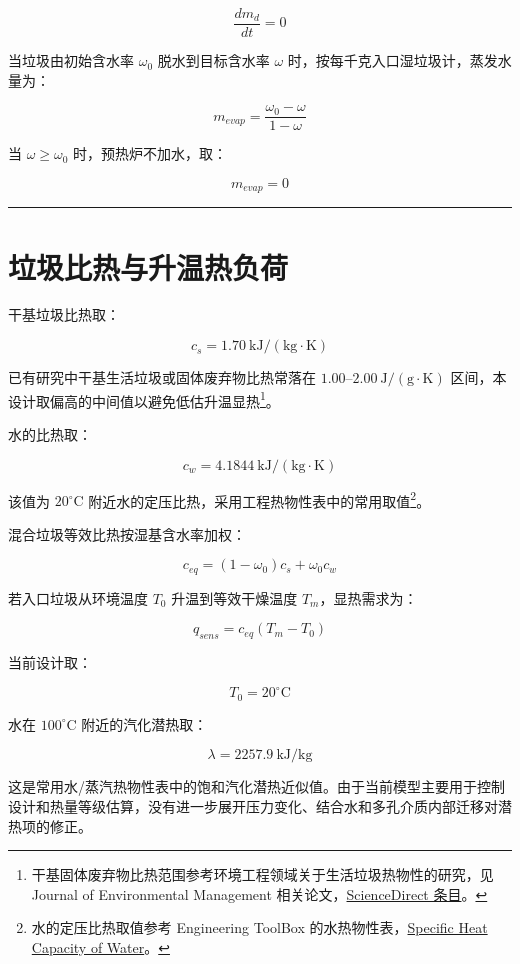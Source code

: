 \documentclass[UTF8,openany,zihao=-4,oneside]{ctexbook}
\newcommand{\manualdivider}{\par\vspace{0.6em}\noindent\textcolor{FGLine}{\rule{\linewidth}{0.7pt}}\vspace{0.6em}\par}
\begin{document}
\[
\frac{d m_d}{dt}=0
\]

当垃圾由初始含水率 \(\omega_0\) 脱水到目标含水率 \(\omega\) 时，按每千克入口湿垃圾计，蒸发水量为：

\[
m_{evap}=\frac{\omega_0-\omega}{1-\omega}
\]

当 \(\omega\ge\omega_0\) 时，预热炉不加水，取：

\[
m_{evap}=0
\]

\manualdivider

\section{垃圾比热与升温热负荷}\label{ux5783ux573eux6bd4ux70edux4e0eux5347ux6e29ux70edux8d1fux8377}

干基垃圾比热取：

\[
c_s=1.70\ \mathrm{kJ/(kg\cdot K)}
\]

已有研究中干基生活垃圾或固体废弃物比热常落在 \(1.00\text{--}2.00\ \mathrm{J/(g\cdot K)}\) 区间，本设计取偏高的中间值以避免低估升温显热\footnote{干基固体废弃物比热范围参考环境工程领域关于生活垃圾热物性的研究，见 Journal of Environmental Management 相关论文，\href{https://www.sciencedirect.com/science/article/pii/S0301479722022241}{ScienceDirect 条目}。}。

水的比热取：

\[
c_w=4.1844\ \mathrm{kJ/(kg\cdot K)}
\]

该值为 \(20^\circ\mathrm{C}\) 附近水的定压比热，采用工程热物性表中的常用取值\footnote{水的定压比热取值参考 Engineering ToolBox 的水热物性表，\href{https://www.engineeringtoolbox.com/specific-heat-capacity-water-d_660.html}{Specific Heat Capacity of Water}。}。

混合垃圾等效比热按湿基含水率加权：

\[
c_{eq}=(1-\omega_0)c_s+\omega_0c_w
\]

若入口垃圾从环境温度 \(T_0\) 升温到等效干燥温度 \(T_m\)，显热需求为：

\[
q_{sens}=c_{eq}(T_m-T_0)
\]

当前设计取：

\[
T_0=20^\circ\mathrm{C}
\]

水在 \(100^\circ\mathrm{C}\) 附近的汽化潜热取：

\[
\lambda=2257.9\ \mathrm{kJ/kg}
\]

这是常用水/蒸汽热物性表中的饱和汽化潜热近似值。由于当前模型主要用于控制设计和热量等级估算，没有进一步展开压力变化、结合水和多孔介质内部迁移对潜热项的修正。
\end{document}
